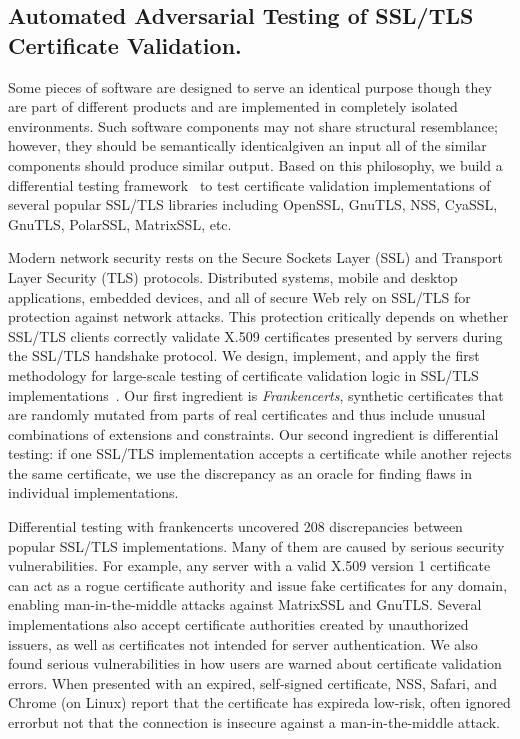 \documentclass[a4paper, 11pt]{article}
\begin{document}
\begin{small}
\subsection*{\small Automated Adversarial Testing of SSL/TLS Certificate Validation.}

Some pieces of software are designed to serve an identical purpose though they are part 
of different products and are implemented in completely isolated environments. Such software 
components may not share structural resemblance; however, they should be semantically 
identical\textemdash given an input all of the similar components should produce similar output. 
Based on this philosophy, we build a differential testing framework~\cite{KeemanDifferentialTesting1998} 
to test certificate validation implementations of several popular SSL/TLS libraries including OpenSSL, 
GnuTLS, NSS, CyaSSL, GnuTLS, PolarSSL, MatrixSSL, etc.

Modern network security rests on the Secure Sockets Layer (SSL) and
Transport Layer Security (TLS) protocols.  Distributed systems, mobile
and desktop applications, embedded devices, and all of secure Web rely
on SSL/TLS for protection against network attacks.  This protection
critically depends on whether SSL/TLS clients correctly validate X.509
certificates presented by servers during the SSL/TLS handshake protocol.
We design, implement, and apply the first methodology for large-scale
testing of certificate validation logic in SSL/TLS implementations~\cite{brubaker2014using}.
Our first ingredient is {\em Frankencerts}, synthetic certificates that are
randomly mutated from parts of real certificates and thus include unusual
combinations of extensions and constraints.  Our second ingredient is
differential testing: if one SSL/TLS implementation accepts a certificate
while another rejects the same certificate, we use the discrepancy as
an oracle for finding flaws in individual implementations.


Differential testing with frankencerts uncovered 208 discrepancies between
popular SSL/TLS implementations. Many of them are caused by serious security
vulnerabilities.  For example, any server with a valid X.509 version
1 certificate can act as a rogue certificate authority and issue fake
certificates for any domain, enabling man-in-the-middle attacks against
MatrixSSL and GnuTLS.  Several implementations also accept certificate
authorities created by unauthorized issuers, as well as certificates
not intended for server authentication. We also found serious vulnerabilities in how users are warned about
certificate validation errors.  When presented with an expired,
self-signed certificate, NSS, Safari, and Chrome (on Linux) report
that the certificate has expired\textemdash a low-risk, often ignored
error\textemdash but not that the connection is insecure against a
man-in-the-middle attack.


\end{small}
\end{document}
